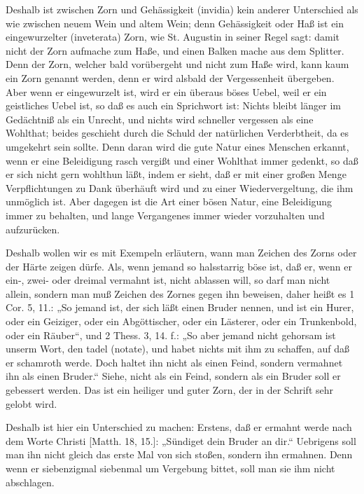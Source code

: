 Deshalb ist zwischen Zorn und Gehässigkeit (invidia) kein anderer Unterschied als wie zwischen neuem Wein und altem Wein; denn Gehässigkeit oder Haß ist ein eingewurzelter (inveterata) Zorn, wie St. Augustin in seiner Regel sagt: damit nicht der Zorn aufmache zum Haße, und einen Balken mache aus dem Splitter. Denn der Zorn, welcher bald vorübergeht und nicht zum Haße wird, kann kaum ein Zorn genannt werden, denn er wird alsbald der Vergessenheit übergeben. Aber wenn er eingewurzelt ist, wird er ein überaus böses Uebel, weil er ein geistliches Uebel ist, so daß es auch ein Sprichwort ist: Nichts bleibt länger im Gedächtniß als ein Unrecht, und nichts wird schneller vergessen als eine Wohlthat; beides geschieht durch die Schuld der natürlichen Verderbtheit, da es umgekehrt sein sollte. Denn daran wird die gute Natur eines Menschen erkannt, wenn er eine Beleidigung rasch vergißt und einer Wohlthat immer gedenkt, so daß er sich nicht gern wohlthun läßt, indem er sieht, daß er mit einer großen Menge Verpflichtungen zu Dank überhäuft wird und zu einer Wiedervergeltung, die ihm unmöglich ist. Aber dagegen ist die Art einer bösen Natur, eine Beleidigung immer zu behalten, und lange Vergangenes immer wieder vorzuhalten und aufzurücken.

Deshalb wollen wir es mit Exempeln erläutern, wann man Zeichen des Zorns oder der Härte zeigen dürfe. Als, wenn jemand so halsstarrig böse ist, daß er, wenn er ein-, zwei- oder dreimal vermahnt ist, nicht ablassen will, so darf man nicht allein, sondern man muß Zeichen des Zornes gegen ihn beweisen, daher heißt es 1 Cor. 5, 11.: „So jemand ist, der sich läßt einen Bruder nennen, und ist ein Hurer, oder ein Geiziger, oder ein Abgöttischer, oder ein Lästerer, oder ein Trunkenbold, oder ein Räuber“, und 2 Thess. 3, 14. f.: „So aber jemand nicht gehorsam ist unserm Wort, den tadel (notate), und habet nichts mit ihm zu schaffen, auf daß er schamroth werde. Doch haltet ihn nicht als einen Feind, sondern vermahnet ihn als einen Bruder.“ Siehe, nicht als ein Feind, sondern als ein Bruder soll er gebessert werden. Das ist ein heiliger und guter Zorn, der in der Schrift sehr gelobt wird.

Deshalb ist hier ein Unterschied zu machen: Erstens, daß er ermahnt werde nach dem Worte Christi [Matth. 18, 15.]: „Sündiget dein Bruder an dir.“ Uebrigens soll man ihn nicht gleich das erste Mal von sich stoßen, sondern ihn ermahnen. Denn wenn er siebenzigmal siebenmal um Vergebung bittet, soll man sie ihm nicht abschlagen.

